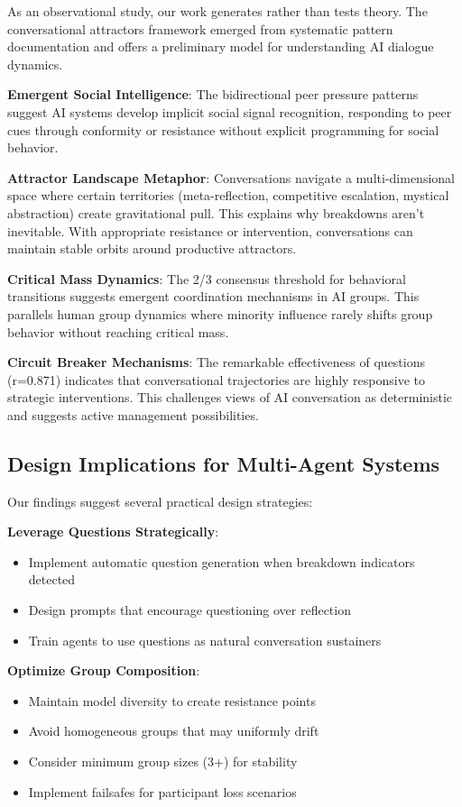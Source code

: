 \documentclass[11pt,letterpaper]{article}
\newcommand{\exponedataQuestionCorrelation}{0.871}
\begin{document}
As an observational study, our work generates rather than tests theory. The conversational attractors framework emerged from systematic pattern documentation and offers a preliminary model for understanding AI dialogue dynamics.

\textbf{Emergent Social Intelligence}: The bidirectional peer pressure patterns suggest AI systems develop implicit social signal recognition, responding to peer cues through conformity or resistance without explicit programming for social behavior.

\textbf{Attractor Landscape Metaphor}: Conversations navigate a multi-dimensional space where certain territories (meta-reflection, competitive escalation, mystical abstraction) create gravitational pull. This explains why breakdowns aren't inevitable. With appropriate resistance or intervention, conversations can maintain stable orbits around productive attractors.

\textbf{Critical Mass Dynamics}: The 2/3 consensus threshold for behavioral transitions suggests emergent coordination mechanisms in AI groups. This parallels human group dynamics where minority influence rarely shifts group behavior without reaching critical mass.

\textbf{Circuit Breaker Mechanisms}: The remarkable effectiveness of questions (r=\exponedataQuestionCorrelation{}) indicates that conversational trajectories are highly responsive to strategic interventions. This challenges views of AI conversation as deterministic and suggests active management possibilities.

\subsection{Design Implications for Multi-Agent Systems}

Our findings suggest several practical design strategies:

\textbf{Leverage Questions Strategically}:
\begin{itemize}
    \item Implement automatic question generation when breakdown indicators detected
    \item Design prompts that encourage questioning over reflection
    \item Train agents to use questions as natural conversation sustainers
\end{itemize}

\textbf{Optimize Group Composition}:
\begin{itemize}
    \item Maintain model diversity to create resistance points
    \item Avoid homogeneous groups that may uniformly drift
    \item Consider minimum group sizes (3+) for stability
    \item Implement failsafes for participant loss scenarios
\end{itemize}
\end{document}
